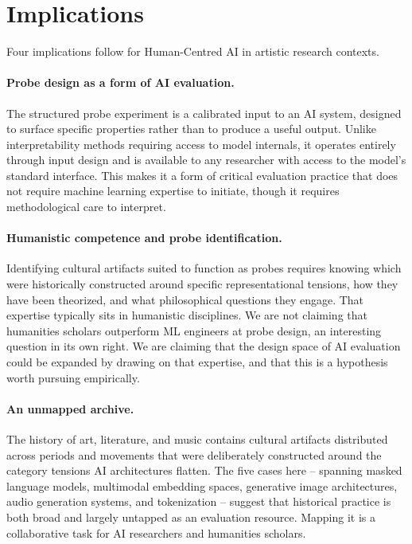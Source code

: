 \documentclass[
  twocolumn,
]{ceurart}
\begin{document}
\section{Implications}

Four implications follow for Human-Centred AI in artistic research contexts.

\paragraph{Probe design as a form of AI evaluation.}
The structured probe experiment is a calibrated input to an AI system, designed to surface specific properties rather than to produce a useful output. Unlike interpretability methods requiring access to model internals, it operates entirely through input design and is available to any researcher with access to the model's standard interface. This makes it a form of critical evaluation practice that does not require machine learning expertise to initiate, though it requires methodological care to interpret.

\paragraph{Humanistic competence and probe identification.}
Identifying cultural artifacts suited to function as probes requires knowing which were historically constructed around specific representational tensions, how they have been theorized, and what philosophical questions they engage. That expertise typically sits in humanistic disciplines. We are not claiming that humanities scholars outperform ML engineers at probe design, an interesting question in its own right. We are claiming that the design space of AI evaluation could be expanded by drawing on that expertise, and that this is a hypothesis worth pursuing empirically.

\paragraph{An unmapped archive.}
The history of art, literature, and music contains cultural artifacts distributed across periods and movements that were deliberately constructed around the category tensions AI architectures flatten. The five cases here -- spanning masked language models, multimodal embedding spaces, generative image architectures, audio generation systems, and tokenization -- suggest that historical practice is both broad and largely untapped as an evaluation resource. Mapping it is a collaborative task for AI researchers and humanities scholars.
\end{document}
